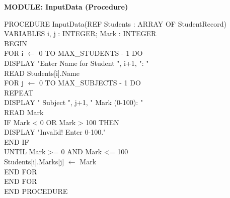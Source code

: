 \documentclass[11pt]{article}
\begin{document}
\begin{exoresolu}
\textbf{MODULE: InputData (Procedure)}
\begin{flushleft}
\ttfamily\small
PROCEDURE InputData(REF Students : ARRAY OF StudentRecord)\\
VARIABLES i, j : INTEGER; Mark : INTEGER\\
BEGIN\\
\hspace{1em}FOR i $\leftarrow$ 0 TO MAX\_STUDENTS - 1 DO\\
\hspace{2em}DISPLAY "Enter Name for Student ", i+1, ": "\ \\
\hspace{2em}READ Students[i].Name\\
\hspace{2em}FOR j $\leftarrow$ 0 TO MAX\_SUBJECTS - 1 DO\\
\hspace{3em}REPEAT\\
\hspace{4em}DISPLAY "  Subject ", j+1, " Mark (0-100): "\ \\
\hspace{4em}READ Mark\\
\hspace{4em}IF Mark < 0 OR Mark > 100 THEN\\
\hspace{5em}DISPLAY "Invalid! Enter 0-100."\\
\hspace{4em}END IF\\
\hspace{3em}UNTIL Mark >= 0 AND Mark <= 100\\
\hspace{3em}Students[i].Marks[j] $\leftarrow$ Mark\\
\hspace{2em}END FOR\\
\hspace{1em}END FOR\\
END PROCEDURE
\end{flushleft}


\end{exoresolu}
\end{document}
